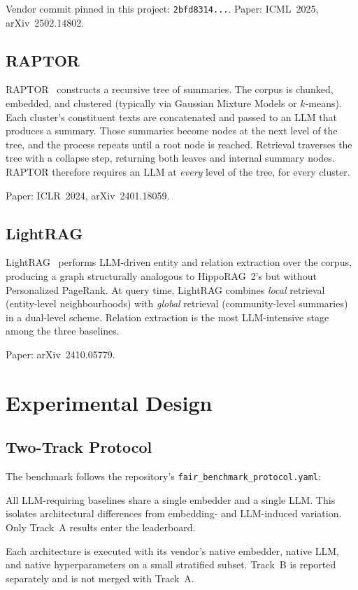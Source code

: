 \documentclass[11pt,a4paper]{article}
\begin{document}
Vendor commit pinned in this project: \texttt{2bfd8314...}. Paper: ICML~2025, arXiv~2502.14802.

\subsection{RAPTOR}

RAPTOR~\cite{raptor} constructs a recursive tree of summaries. The corpus is chunked, embedded, and clustered (typically via Gaussian Mixture Models or $k$-means). Each cluster's constituent texts are concatenated and passed to an LLM that produces a summary. Those summaries become nodes at the next level of the tree, and the process repeats until a root node is reached. Retrieval traverses the tree with a collapse step, returning both leaves and internal summary nodes. RAPTOR therefore requires an LLM at \emph{every} level of the tree, for every cluster.

Paper: ICLR~2024, arXiv~2401.18059.

\subsection{LightRAG}

LightRAG~\cite{lightrag} performs LLM-driven entity and relation extraction over the corpus, producing a graph structurally analogous to HippoRAG~2's but without Personalized PageRank. At query time, LightRAG combines \emph{local} retrieval (entity-level neighbourhoods) with \emph{global} retrieval (community-level summaries) in a dual-level scheme. Relation extraction is the most LLM-intensive stage among the three baselines.

Paper: arXiv~2410.05779.

\section{Experimental Design}
\label{sec:design}

\subsection{Two-Track Protocol}

The benchmark follows the repository's \texttt{fair\_benchmark\_protocol.yaml}:

\begin{description}[leftmargin=1.2cm,style=nextline]
  \item[Track~A --- Controlled Architectural Comparison (primary).] All LLM-requiring baselines share a single embedder and a single LLM. This isolates architectural differences from embedding- and LLM-induced variation. Only Track~A results enter the leaderboard.
  \item[Track~B --- Native-Fidelity Reference (secondary).] Each architecture is executed with its vendor's native embedder, native LLM, and native hyperparameters on a small stratified subset. Track~B is reported separately and is not merged with Track~A.
\end{description}
\end{document}
